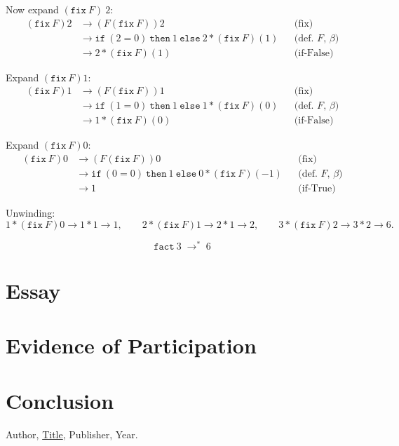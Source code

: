 \documentclass{article}
\theoremstyle{theorem}
\theoremstyle{definition}
\theoremstyle{remark}
\begin{document}
Now expand \((\mathtt{fix}\ F)\ 2\):
\begin{align*}
(\mathtt{fix}\ F)2
&\to (F(\mathtt{fix}\ F))2 &&\text{(fix)}\\
&\to \mathtt{if}\ (2=0)\ \mathtt{then}\ 1\ \mathtt{else}\ 2 * (\mathtt{fix}\ F)(1)
&&\text{(def.\ \(F\), \(\beta\))}\\
&\to 2 * (\mathtt{fix}\ F)(1)
&&\text{(if-False)}
\end{align*}

Expand \((\mathtt{fix}\ F)1\):
\begin{align*}
(\mathtt{fix}\ F)1
&\to (F(\mathtt{fix}\ F))1 &&\text{(fix)}\\
&\to \mathtt{if}\ (1=0)\ \mathtt{then}\ 1\ \mathtt{else}\ 1 * (\mathtt{fix}\ F)(0)
&&\text{(def.\ \(F\), \(\beta\))}\\
&\to 1 * (\mathtt{fix}\ F)(0)
&&\text{(if-False)}
\end{align*}

Expand \((\mathtt{fix}\ F)0\):
\begin{align*}
(\mathtt{fix}\ F)0
&\to (F(\mathtt{fix}\ F))0 &&\text{(fix)}\\
&\to \mathtt{if}\ (0=0)\ \mathtt{then}\ 1\ \mathtt{else}\ 0 * (\mathtt{fix}\ F)(-1)
&&\text{(def.\ \(F\), \(\beta\))}\\
&\to 1
&&\text{(if-True)}
\end{align*}

Unwinding:
\[
1 * (\mathtt{fix}\ F)0 \to 1 * 1 \to 1,\qquad
2 * (\mathtt{fix}\ F)1 \to 2 * 1 \to 2,\qquad
3 * (\mathtt{fix}\ F)2 \to 3 * 2 \to 6.
\]

\[
\boxed{\ \mathtt{fact}\ 3 \;\to^{\!*}\; 6\ }
\]



\section{Essay}

\section{Evidence of Participation}

\section{Conclusion}\label{conclusion}

\begin{thebibliography}{99}
 Author, \href{https://en.wikipedia.org/wiki/LaTeX}{Title}, Publisher, Year.
\end{thebibliography}
\end{document}
